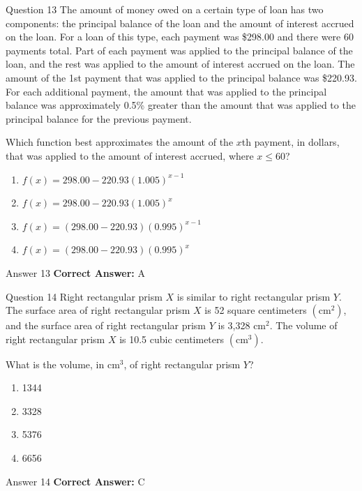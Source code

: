 \documentclass{beamer}
\begin{document}
\begin{frame}{Question 13}
\small
The amount of money owed on a certain type of loan has two components: the principal balance of the loan and the amount of interest accrued on the loan.  
For a loan of this type, each payment was \$298.00 and there were 60 payments total. Part of each payment was applied to the principal balance of the loan, and the rest was applied to the amount of interest accrued on the loan.  
The amount of the 1st payment that was applied to the principal balance was \$220.93.  
For each additional payment, the amount that was applied to the principal balance was approximately 0.5\% greater than the amount that was applied to the principal balance for the previous payment.  

Which function best approximates the amount of the \(x\)th payment, in dollars, that was applied to the amount of interest accrued, where \(x \leq 60\)?
\vspace{0.35cm}
\begin{enumerate}
    \item[A.] $f(x) = 298.00 - 220.93(1.005)^{x-1}$
    \item[B.] $f(x) = 298.00 - 220.93(1.005)^{x}$
    \item[C.] $f(x) = (298.00 - 220.93)(0.995)^{x-1}$
    \item[D.] $f(x) = (298.00 - 220.93)(0.995)^x$
\end{enumerate}
\end{frame}
\begin{frame}{Answer 13}
\small
\textbf{Correct Answer:} A
\end{frame}

\begin{frame}{Question 14}
\small
Right rectangular prism \(X\) is similar to right rectangular prism \(Y\).  
The surface area of right rectangular prism \(X\) is 52 square centimeters \((\text{cm}^2)\), and the surface area of right rectangular prism \(Y\) is 3,328 \(\text{cm}^2\).  
The volume of right rectangular prism \(X\) is 10.5 cubic centimeters \((\text{cm}^3)\).  

What is the volume, in \(\text{cm}^3\), of right rectangular prism \(Y\)?
\vspace{0.35cm}
\begin{enumerate}
    \item[A.] 1344
    \item[B.] 3328
    \item[C.] 5376
    \item[D.] 6656
\end{enumerate}
\end{frame}
\begin{frame}{Answer 14}
\small
\textbf{Correct Answer:} C
\end{frame}
\end{document}
